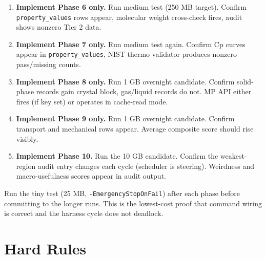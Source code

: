 \documentclass[11pt, a4paper]{article}
\begin{document}
\begin{enumerate}[leftmargin=*, itemsep=4pt]
  \item \textbf{Implement Phase 6 only.}  Run medium test (250 MB target).
		Confirm \texttt{property\_values} rows appear, molecular weight
		cross-check fires, audit shows nonzero Tier 2 data.

  \item \textbf{Implement Phase 7 only.}  Run medium test again.
		Confirm Cp curves appear in \texttt{property\_values}, NIST thermo
		validator produces nonzero pass/missing counts.

  \item \textbf{Implement Phase 8 only.}  Run 1 GB overnight candidate.
		Confirm solid-phase records gain crystal block, gas/liquid records
		do not.  MP API either fires (if key set) or operates in cache-read mode.

  \item \textbf{Implement Phase 9 only.}  Run 1 GB overnight candidate.
		Confirm transport and mechanical rows appear.  Average composite score
		should rise visibly.

  \item \textbf{Implement Phase 10.}  Run the 10 GB candidate.
		Confirm the weakest-region audit entry changes each cycle
		(scheduler is steering).  Weirdness and macro-usefulness scores appear
		in audit output.
\end{enumerate}

\begin{rulebox}
Run the tiny test (25 MB, \texttt{-EmergencyStopOnFail}) after each phase
before committing to the longer runs.  This is the lowest-cost proof that
command wiring is correct and the harness cycle does not deadlock.
\end{rulebox}

\section{Hard Rules}
\label{sec:hardrules}
\end{document}
